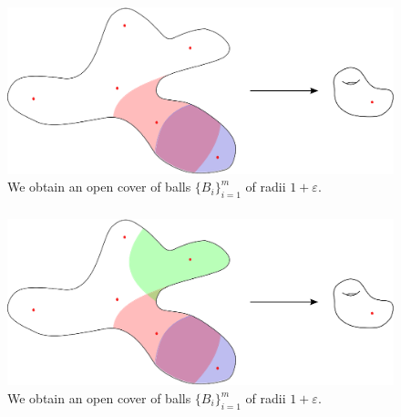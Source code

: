 \documentclass{beamer}
\begin{document}
\begin{frame}\frametitle{}

\begin{figure}
\centering
\includegraphics[scale=0.6]{Nerving5.eps}
\caption{We obtain an open cover of balls $\{ B_i \}_{i=1}^m$ of radii $1+\varepsilon$.}
\end{figure}


\end{frame}



\begin{frame}\frametitle{}

\begin{figure}
\centering
\includegraphics[scale=0.6]{Nerving6.eps}
\caption{We obtain an open cover of balls $\{ B_i \}_{i=1}^m$ of radii $1+\varepsilon$.}
\end{figure}


\end{frame}
\end{document}
